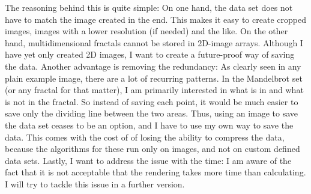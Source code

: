 \documentclass[10pt,a4paper,titlepage]{article}
\begin{document}
	The reasoning behind this is quite simple: On one hand, the data set does not have to match the image created in the end. This makes it easy to create cropped images, images with a lower resolution (if needed) and the like. On the other hand, multidimensional fractals cannot be stored in 2D-image arrays. Although I have yet only created 2D images, I want to create a future-proof way of saving the data. Another advantage is removing the redundancy: As clearly seen in any plain example image, there are a lot of recurring patterns. In the Mandelbrot set (or any fractal for that matter), I am primarily interested in what is in and what is not in the fractal. So instead of saving each point, it would be much easier to save only the dividing line between the two areas. Thus, using an image to save the data set ceases to be an option, and I have to use my own way to save the data. This comes with the cost of of losing the ability to compress the data, because the algorithms for these run only on images, and not on custom defined data sets. Lastly, I want to address the issue with the time: I am aware of the fact that it is not acceptable that the rendering takes more time than calculating. I will try to tackle this issue in a further version.
\end{document}
